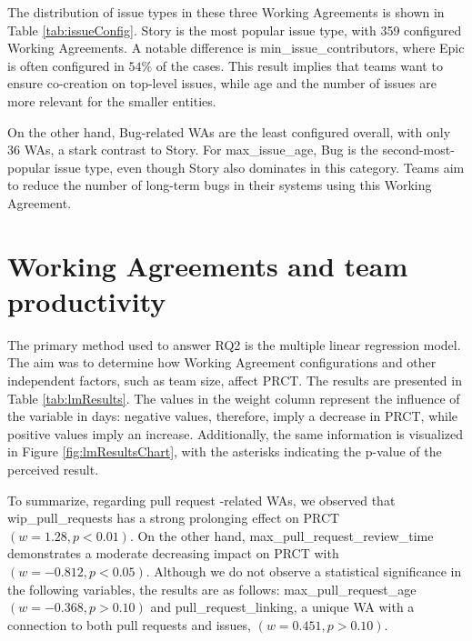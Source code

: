 The distribution of issue types in these three Working Agreements is shown in Table \ref{tab:issueConfig}. Story is the most popular issue type, with 359 configured Working Agreements. A notable difference is min\_issue\_contributors, where Epic is often configured in $54\%$ of the cases. This result implies that teams want to ensure co-creation on top-level issues, while age and the number of issues are more relevant for the smaller entities. 



On the other hand, Bug-related WAs are the least configured overall, with only 36 WAs, a stark contrast to Story. For max\_issue\_age, Bug is the second-most-popular issue type, even though Story also dominates in this category. Teams aim to reduce the number of long-term bugs in their systems using this Working Agreement. 



\section{Working Agreements and team productivity}


The primary method used to answer RQ2 is the multiple linear regression model. The aim was to determine how Working Agreement configurations and other independent factors, such as team size, affect PRCT. The results are presented in Table \ref{tab:lmResults}. The values in the weight column represent the influence of the variable in days: negative values, therefore, imply a decrease in PRCT, while positive values imply an increase. Additionally, the same information is visualized in Figure \ref{fig:lmResultsChart}, with the asterisks indicating the p-value of the perceived result.


To summarize, regarding pull request -related WAs, we observed that wip\_pull\_requests has a strong prolonging effect on PRCT $(w=1.28,p<0.01)$. On the other hand, max\_pull\_request\_review\_time demonstrates a moderate decreasing impact on PRCT with $(w=-0.812,p<0.05)$. Although we do not observe a statistical significance in the following variables, the results are as follows: max\_pull\_request\_age $(w=-0.368,p>0.10)$ and pull\_request\_linking, a unique WA with a connection to both pull requests and issues, $(w=0.451,p>0.10)$.  

